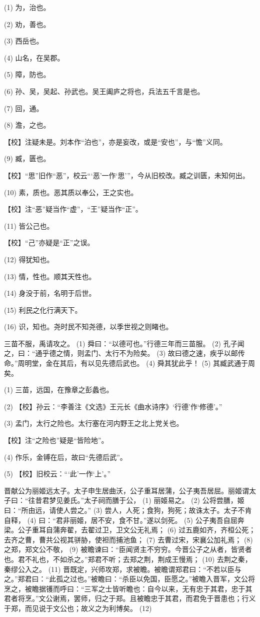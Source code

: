 \documentclass[12pt,UTF8]{ctexbook}
\begin{document}
(1) 为，治也。

(2) 劝，善也。

(3) 西岳也。

(4) 山名，在吴郡。

(5) 障，防也。

(6) 孙、吴，吴起、孙武也。吴王阖庐之将也，兵法五千言是也。

(7) 回，通。

(8) 澹，之也。

【校】注疑未是。刘本作“泊也”，亦是妄改，或是“安也”，与“憺”义同。

(9) 臧，匮也。

【校】“思”旧作“恶”，校云“‘恶’一作‘思’”，今从旧校改。臧之训匮，未知何出。

(10) 素，质也。恶其质以奉公，王之实也。

【校】注“恶”疑当作“虚”，“王”疑当作“正”。

(11) 皆公己也。

【校】“己”亦疑是“正”之误。

(12) 得犹知也。

(13) 情，性也。顺其天性也。

(14) 身没于前，名明于后世。

(15) 利民之化行满天下。

(16) 识，知也。尧时民不知尧德，以季世视之则睹也。

三苗不服，禹请攻之。 (1) 舜曰：“以德可也。”行德三年而三苗服。 (2) 孔子闻之，曰：“通乎德之情，则孟门、太行不为险矣。 (3) 故曰德之速，疾乎以邮传命。”周明堂，金在其后，有以见先德后武也。 (4) 舜其犹此乎！ (5) 其臧武通于周矣。

(1) 三苗，远国，在豫章之彭蠡也。

(2) 【校】孙云：“李善注《文选》王元长《曲水诗序》‘行德’作‘修德’。”

(3) 孟门，太行之险也。太行塞在河内野王之北上党关也。

【校】注“之险也”疑是“皆险地”。

(4) 作乐，金镈在后，故曰“先德后武”。

(5) 【校】旧校云：“‘此’一作‘上’。”

晋献公为丽姬远太子。太子申生居曲沃，公子重耳居蒲，公子夷吾居屈。丽姬谓太子曰：“往昔君梦见姜氏。”太子祠而膳于公， (1) 丽姬易之。 (2) 公将尝膳，姬曰：“所由远，请使人尝之。” (3) 尝人，人死；食狗，狗死；故诛太子。太子不肯自释， (4) 曰：“君非丽姬，居不安，食不甘。”遂以剑死。 (5) 公子夷吾自屈奔梁。公子重耳自蒲奔翟，去翟过卫，卫文公无礼焉； (6) 过五鹿如齐，齐桓公死；去齐之曹，曹共公视其骈胁，使袒而捕池鱼； (7) 去曹过宋，宋襄公加礼焉； (8) 之郑，郑文公不敬， (9) 被瞻谏曰：“臣闻贤主不穷穷。今晋公子之从者，皆贤者也。君不礼也，不如杀之。”郑君不听；去郑之荆，荆成王慢焉； (10) 去荆之秦，秦缪公入之。 (11) 晋既定，兴师攻郑，求被瞻。被瞻谓郑君曰：“不若以臣与之。”郑君曰：“此孤之过也。”被瞻曰：“杀臣以免国，臣愿之。”被瞻入晋军，文公将烹之，被瞻据镬而呼曰：“三军之士皆听瞻也：自今以来，无有忠于其君，忠于其君者将烹。”文公谢焉，罢师，归之于郑。且被瞻忠于其君，而君免于晋患也；行义于郑，而见说于文公也；故义之为利博矣。 (12)
\end{document}
